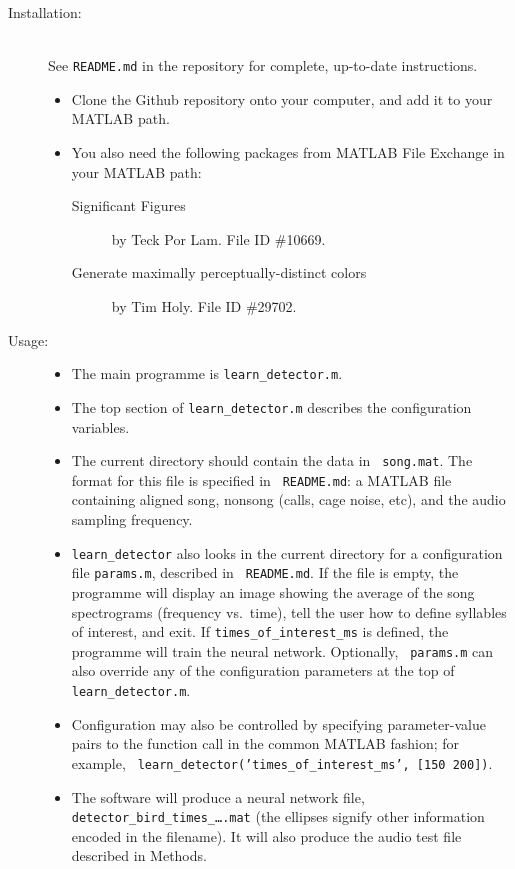 \documentclass[10pt,letterpaper]{article}
\begin{document}
\begin{description}
  \begin{description}
  \item[Installation:]\hfill\\
    See {\tt README.md} in the repository for complete, up-to-date instructions.
    \begin{itemize}
    \item Clone the Github repository onto your computer, and add it to your MATLAB path.
    \item You also need the following packages from MATLAB File Exchange in your MATLAB path:
      \begin{description}
      \item[Significant Figures] by Teck Por Lam.  File ID \#10669.
      \item[Generate maximally perceptually-distinct colors] by Tim Holy.  File ID \#29702.
      \end{description}
    \end{itemize}
  \item[Usage:]\hfill
    \begin{itemize}
    \item The main programme is {\tt learn\_detector.m}.
    \item The top section of {\tt learn\_detector.m}
      describes the configuration variables.
    \item The current directory should contain the data in {\tt
      song.mat}. The format for this file is specified in {\tt
      README.md}: a MATLAB file containing aligned song, nonsong
      (calls, cage noise, etc), and the audio sampling frequency.
    \item {\tt learn\_detector} also looks in the current directory for
      a configuration file {\tt params.m}, described in {\tt
        README.md}.  If the file is empty, the programme will display
      an image showing the average of the song spectrograms (frequency
      vs.~time), tell the user how to define syllables of interest,
      and exit.  If {\tt times\_of\_interest\_ms} is defined, the
      programme will train the neural network.  Optionally, {\tt
        params.m} can also override any of the configuration
      parameters at the top of {\tt learn\_detector.m}.
    \item Configuration may also be controlled by specifying
      parameter-value pairs to the function call in the common MATLAB
      fashion; for example, {\tt
        learn\_detector('times\_of\_interest\_ms', [150 200])}.
    \item The software will produce a neural network file, {\tt
      detector\_bird\_times\_\dots.mat} (the ellipses signify other
      information encoded in the filename).  It will also produce the
      audio test file described in Methods.
    \end{itemize}
  \end{description}
  

\end{description}
\end{document}
